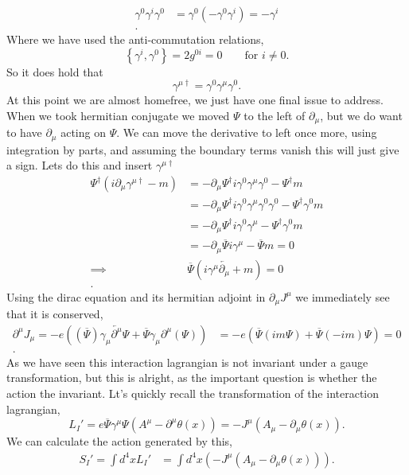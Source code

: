 \documentclass[working, oneside]{../../../Preambles/tuftebook}
\begin{document}
\begin{solution}
\begin{align*}
    \gamma^{0}\gamma^{i}\gamma^{0} &= \gamma^{0}\left( -\gamma^{0}\gamma^{i} \right) = -\gamma^{i}  \\
.\end{align*}
Where we have used the anti-commutation relations,
\[
\left\{ \gamma^{i}, \gamma^{0} \right\} = 2g^{0i} = 0\quad\quad\text{for }i \neq 0
.\] 
So it does hold that 
\[
\gamma^{\mu \dagger} =\gamma^{0}\gamma^{\mu }\gamma^{0}
.\] 
At this point we are almost homefree, we just have one final issue to address. When we took hermitian conjugate we moved $\Psi$ to the left of $\partial_\mu $, but we do want to have $\partial_\mu $ acting on $\Psi$. We can move the derivative to left once more, using integration by parts, and assuming the boundary terms vanish this will just give a sign. Lets do this and insert $\gamma^{\mu  \dagger}$ 
\begin{align*}   
\Psi^\dagger\left( i\partial_{\mu }\gamma^{\mu \dagger} - m\right) &= -\partial_{\mu }\Psi^{\dagger}i\gamma^{0}\gamma^{\mu }\gamma^{0} - \Psi^{\dagger} m \\
&= -\partial_{\mu }\Psi^{\dagger}i\gamma^{0}\gamma^{\mu }\gamma^{0}\gamma^{0} - \Psi^{\dagger}\gamma^{0} m \\
&= -\partial_{\mu }\Psi^{\dagger}i\gamma^{0}\gamma^{\mu }- \Psi^{\dagger}\gamma^{0} m \\
&= -\partial_{\mu }\overline{\Psi}i\gamma^{\mu }- \overline{\Psi} m =0\\
\implies & \overline{\Psi} \left(   i\gamma^{\mu }\overleftarrow{\partial_{\mu }} + m\right) =0\\
.\end{align*}
Using the dirac equation and its hermitian adjoint in $\partial_{\mu }J^{\mu }$ we immediately see that it is conserved,
\begin{align*}
    \partial^{\mu }J_{\mu } =  -e\left( \left( \overline{\Psi} \right) \gamma_{\mu }\overleftarrow{\partial^{\mu }}\Psi + \overline{\Psi}\gamma_{\mu }\partial^{\mu }\left(   \Psi  \right)\right) 
    &= -e\left( \overline{\Psi}\left( im \Psi \right) + \overline{\Psi}\left( -im  \right) \Psi  \right) = 0 \\
.\end{align*} 
As we have seen this interaction lagrangian is not invariant under a gauge transformation, but this is alright, as the important question is whether the action the invariant. Lt's quickly recall the transformation of the interaction lagrangian,
\[
L_{I}' = e \overline{\Psi}\gamma^{\mu }\Psi\left( A^{\mu }- \partial^{\mu }\theta \left( x \right)  \right) = -J^{\mu }\left( A_{\mu } - \partial_{\mu }\theta \left( x \right)  \right) 
.\] 
We can calculate the action generated by this,
\begin{align*}
    S_{I}' = \int d^{4}x L_{I}' &=  \int d^{4}x \left( -J^{\mu }\left( A_{\mu } - \partial_{\mu }\theta \left( x \right)  \right)  \right)  
.\end{align*}
\end{solution}
\end{document}
